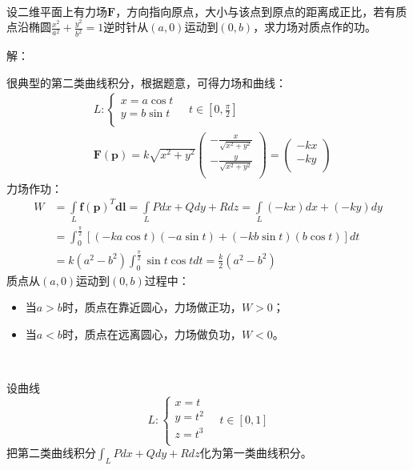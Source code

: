 ~

\begin{exercise}
设二维平面上有力场$\boldsymbol{F}$，方向指向原点，大小与该点到原点的距离成正比，若有质点沿椭圆$\frac{x^2}{a^2}+\frac{y^2}{b^2}=1$逆时针从$\left( a,0 \right) $运动到$\left( 0,b \right) $，求力场对质点作的功。
\end{exercise}

解：

很典型的第二类曲线积分，根据题意，可得力场和曲线：
\begin{align*}
&L:\begin{cases}
	x=a\cos t\\
	y=b\sin t\\
\end{cases} \quad t\in \left[ 0,\frac{\pi}{2} \right] \\
&\boldsymbol{F}\left( \boldsymbol{p} \right) =k\sqrt{x^2+y^2}\left( \begin{array}{c}
	-\frac{x}{\sqrt{x^2+y^2}}\\
	-\frac{y}{\sqrt{x^2+y^2}}\\
\end{array} \right) =\left( \begin{array}{c}
	-kx\\
	-ky\\
\end{array} \right)
\end{align*}
力场作功：
\begin{align*}
W&=\int\limits_L{\boldsymbol{f}\left( \boldsymbol{p} \right) ^T\boldsymbol{dl}}=\int\limits_L{Pdx+Qdy+Rdz}=\int\limits_L{\left( -kx \right) dx+\left( -ky \right) dy} \\
&=\int_0^{\frac{\pi}{2}}{\left[ \left( -ka\cos t \right) \left( -a\sin t \right) +\left( -kb\sin t \right) \left( b\cos t \right) \right] dt} \\
&=k\left( a^2-b^2 \right) \int_0^{\frac{\pi}{2}}{\sin t\cos tdt}=\frac{k}{2}\left( a^2-b^2 \right)
\end{align*}
质点从$\left( a,0 \right) $运动到$\left( 0,b \right) $过程中：
\begin{itemize}
    \item 当$a>b$时，质点在靠近圆心，力场做正功，$W>0$；
    \item 当$a<b$时，质点在远离圆心，力场做负功，$W<0$。
\end{itemize}

~

\begin{exercise}
设曲线
\[
L:\begin{cases}
	x=t\\
	y=t^2\\
	z=t^3\\
\end{cases} \quad t\in \left[ 0,1 \right]
\]
把第二类曲线积分$\int_L{Pdx+Qdy+Rdz}$化为第一类曲线积分。
\end{exercise}

